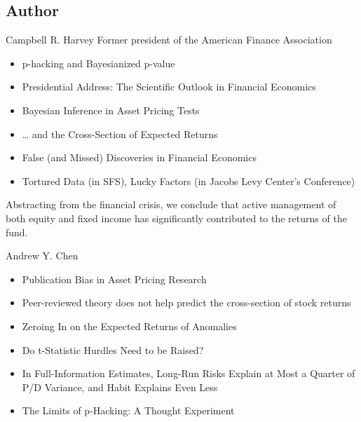 \documentclass[UTF8, 16pt]{beamer}
\begin{document}
\begin{CJK*}{UTF8}{gbsn}
\section{Author}
\begin{frame}{Campbell R. Harvey}
	Former president of the American Finance Association
	\begin{itemize}
		\item p-hacking and Bayesianized p-value
		\item Presidential Address: The Scientific Outlook in Financial Economics
		\item Bayesian Inference in Asset Pricing Tests
		\item … and the Cross-Section of Expected Returns
		\item False (and Missed) Discoveries in Financial Economics
		\item Tortured Data (in SFS), Lucky Factors (in Jacobs Levy Center’s Conference)
	\end{itemize}
	Abstracting from the \alert{financial crisis}, we conclude that active management of both equity and fixed income has significantly contributed to the returns of the fund.
\end{frame}
\begin{frame}{Andrew Y. Chen}
	\begin{itemize}
		\item \alert{Publication Bias} in Asset Pricing Research
		\item Peer-reviewed theory does \alert{not} help predict the cross-section of stock returns
		\item \alert{Zeroing} In on the Expected Returns of Anomalies
		\item Do t-Statistic Hurdles Need to be Raised?
		\item In Full-Information Estimates, Long-Run Risks Explain at Most a Quarter of P/D Variance, and Habit Explains Even Less
		\item The Limits of \alert{p-Hacking}: A Thought Experiment
	\end{itemize}
\end{frame}


\end{CJK*}
\end{document}
